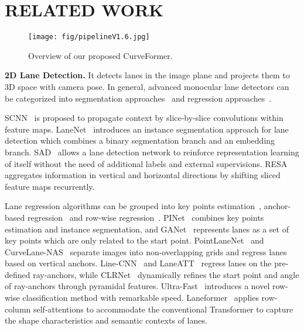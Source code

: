 \documentclass[letterpaper, 10 pt, conference]{ieeeconf}
\begin{document}
\section{RELATED WORK}

\begin{figure*}[htb]
    \vspace{2mm}
	\centering
	\texttt{[image: fig/pipelineV1.6.jpg]}
		\caption{Overview of our proposed CurveFormer.}
	\label{fig:overview}
	\vspace{-5mm}
\end{figure*}

\noindent\textbf{2D Lane Detection.} It detects lanes in the image plane and projects them to 3D space with camera pose. In general, advanced monocular lane detectors can be categorized into segmentation approaches~\cite{pan2017spatial, neven2018towards,hou2019learning,zheng2020resa} 
and regression approaches~\cite{ko2020key, wang2022keypoint, chen2019pointlanenet,li2020curvelane,  li2019line,2020Keep,zheng2022clrnet,qin2020ultra, han2022laneformer}.


SCNN~\cite{pan2017spatial} is proposed to propagate context by slice-by-slice convolutions within feature maps. 
LaneNet~\cite{neven2018towards} introduces an instance segmentation approach for lane detection which combines a binary segmentation branch and an embedding branch. SAD~\cite{hou2019learning} allows a lane detection network to reinforce representation learning of itself without the need of additional labels and external supervisions. RESA~\cite{zheng2020resa} aggregates information in vertical and horizontal directions by shifting sliced feature maps recurrently.

Lane regression algorithms can be grouped into key points estimation~\cite{ko2020key, wang2022keypoint}, anchor-based regression~\cite{chen2019pointlanenet,li2020curvelane,  li2019line,2020Keep,zheng2022clrnet} and row-wise regression~\cite{qin2020ultra, han2022laneformer}. 
PINet~\cite{ko2020key} combines key points estimation and instance segmentation, and GANet~\cite{wang2022keypoint} represents lanes as a set of key points which are only related to the start point.
PointLaneNet~\cite{chen2019pointlanenet} and CurveLane-NAS~\cite{li2020curvelane} separate images into non-overlapping grids and regress lanes based on vertical anchors.
Line-CNN~\cite{li2019line} and LaneATT~\cite{2020Keep} regress lanes on the pre-defined ray-anchors, while CLRNet~\cite{zheng2022clrnet} dynamically refines the start point and angle of ray-anchors through pyramidal features. 
Ultra-Fast~\cite{qin2020ultra} introduces a novel row-wise classification method with remarkable speed.
Laneformer~\cite{han2022laneformer} applies row-column self-attentions to accommodate the conventional Transformer to capture the shape characteristics and semantic contexts of lanes.
\end{document}

